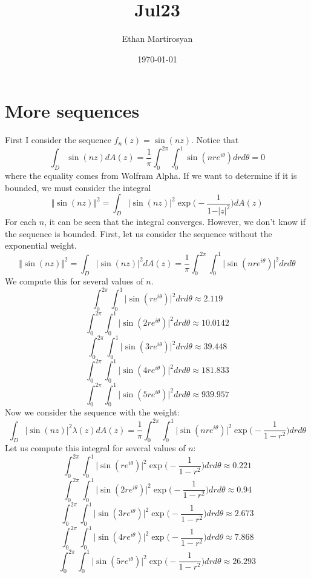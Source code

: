 \documentclass[12pt]{article}
\begin{document}
 
\title{Jul23}
\author{Ethan Martirosyan}
\date{\today}
\maketitle
{}
\hfuzz=50pt
\section*{More sequences}
First I consider the sequence $f_n(z) = \sin(nz)$. Notice that
\[
\int_D \sin(nz) dA(z) = \frac{1}{\pi} \int_0^{2\pi} \int_0^1 \sin(nre^{i\theta}) dr d\theta = 0
\] where the equality comes from Wolfram Alpha. If we want to determine if it is bounded, we must consider the integral
\[
\Vert \sin(nz) \Vert^2 = \int_D \vert \sin(nz) \vert^2 \exp\bigg(-\frac{1}{1-\vert z \vert^2}\bigg) dA(z)
\] For each $n$, it can be seen that the integral converges. However, we don't know if the sequence is bounded. First, let us consider the sequence without the exponential weight.
\[
\Vert \sin(nz) \Vert^2 = \int_D \vert \sin(nz) \vert^2 dA(z) = \frac{1}{\pi} \int_0^{2\pi} \int_0^1 \vert \sin(nre^{i\theta})\vert^2 dr d\theta
\] We compute this for several values of $n$.
\[
\int_0^{2\pi} \int_0^1 \vert \sin(re^{i\theta})\vert^2 dr d\theta \approx  2.119
\]
\[
\int_0^{2\pi} \int_0^1 \vert \sin(2re^{i\theta})\vert^2 dr d\theta \approx  10.0142
\]
\[
\int_0^{2\pi} \int_0^1 \vert \sin(3re^{i\theta})\vert^2 dr d\theta \approx  39.448
\]
\[
\int_0^{2\pi} \int_0^1 \vert \sin(4re^{i\theta})\vert^2 dr d\theta \approx  181.833
\]
\[
\int_0^{2\pi} \int_0^1 \vert \sin(5re^{i\theta})\vert^2 dr d\theta \approx  939.957
\] Now we consider the sequence with the weight:
\[
\int_D \vert \sin(nz) \vert^2 \lambda(z) dA(z) = \frac{1}{\pi} \int_0^{2\pi} \int_0^1 \vert \sin(nre^{i\theta}) \vert^2 \exp\bigg(-\frac{1}{1-r^2}\bigg) dr d\theta
\] Let us compute this integral for several values of $n$:
\[
\int_0^{2\pi} \int_0^1 \vert \sin(re^{i\theta}) \vert^2 \exp\bigg(-\frac{1}{1-r^2}\bigg) dr d\theta \approx 0.221
\]
\[
\int_0^{2\pi} \int_0^1 \vert \sin(2re^{i\theta}) \vert^2 \exp\bigg(-\frac{1}{1-r^2}\bigg) dr d\theta \approx 0.94
\]
\[
\int_0^{2\pi} \int_0^1 \vert \sin(3re^{i\theta}) \vert^2 \exp\bigg(-\frac{1}{1-r^2}\bigg) dr d\theta \approx 2.673
\] 
\[
\int_0^{2\pi} \int_0^1 \vert \sin(4re^{i\theta}) \vert^2 \exp\bigg(-\frac{1}{1-r^2}\bigg) dr d\theta \approx 7.868
\]
\[
\int_0^{2\pi} \int_0^1 \vert \sin(5re^{i\theta}) \vert^2 \exp\bigg(-\frac{1}{1-r^2}\bigg) dr d\theta \approx 26.293
\]
\end{document}
